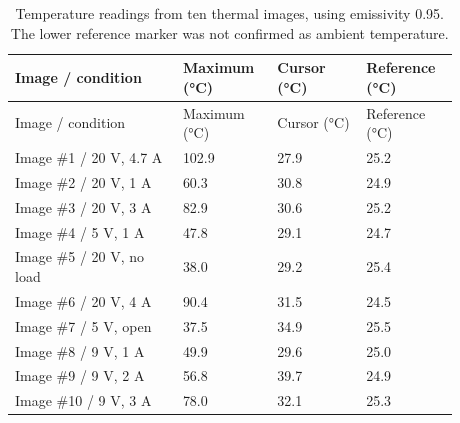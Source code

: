 \begingroup
\scriptsize
\setlength{\tabcolsep}{3pt}
\renewcommand{\arraystretch}{1.12}
\begin{longtable}{@{}L{0.3400\linewidth} L{0.1800\linewidth} L{0.1800\linewidth} L{0.1800\linewidth}@{}}
\caption{Temperature readings from ten thermal images, using emissivity 0.95. The lower reference marker was not confirmed as ambient temperature.}\label{tab:thermal-results-complete}\\
\toprule
Image / condition & Maximum (°C) & Cursor (°C) & Reference (°C)\\
\midrule
\endfirsthead
\toprule
Image / condition & Maximum (°C) & Cursor (°C) & Reference (°C)\\
\midrule
\endhead
Image \#1 / 20 V, 4.7 A & 102.9 & 27.9 & 25.2\\
Image \#2 / 20 V, 1 A & 60.3 & 30.8 & 24.9\\
Image \#3 / 20 V, 3 A & 82.9 & 30.6 & 25.2\\
Image \#4 / 5 V, 1 A & 47.8 & 29.1 & 24.7\\
Image \#5 / 20 V, no load & 38.0 & 29.2 & 25.4\\
Image \#6 / 20 V, 4 A & 90.4 & 31.5 & 24.5\\
Image \#7 / 5 V, open & 37.5 & 34.9 & 25.5\\
Image \#8 / 9 V, 1 A & 49.9 & 29.6 & 25.0\\
Image \#9 / 9 V, 2 A & 56.8 & 39.7 & 24.9\\
Image \#10 / 9 V, 3 A & 78.0 & 32.1 & 25.3\\
\bottomrule
\end{longtable}
\endgroup
